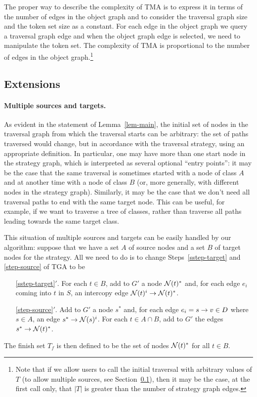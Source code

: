 The proper way to describe the complexity of TMA is to express it in
terms of the number of edges in the object graph and to consider the
traversal graph size and the token set size as a constant. For each
edge in the object graph we query a traversal graph edge and when the
object graph edge is selected, we need to manipulate the token
set. The complexity of TMA is proportional to the number of edges in
the object graph.\footnote{ Note that if we allow users to call the
initial traversal with arbitrary values of $T$ (to allow multiple
sources, see Section~\ref{ssec-rem}), then it may be the case, at the
first call only, that $|T|$ is greater than the number of strategy
graph edges.  }


\subsection{Extensions}
\label{ssec-rem}
\label{sec-ext}
\paragraph{Multiple sources and targets.}  As evident in the statement
of Lemma~\ref{lem-main}, the initial set of nodes in the traversal
graph from which the traversal starts can be arbitrary: the set of
paths traversed would change, but in accordance with the traversal
strategy, using an appropriate definition.  In particular, one may
have more than one start node in the strategy graph, which is
interpreted as several optional ``entry points'': it may be the case
that the same traversal is sometimes started with a node of class $A$
and at another time with a node of class $B$ (or, more generally, with
different nodes in the strategy graph).  Similarly, it may be the case
that we don't need all traversal paths to end with the same target
node.  This can be useful, for example, if we want to traverse a tree
of classes, rather than traverse all paths leading towards the same
target class.

This situation of multiple sources and targets can be easily handled
by our algorithm: suppose that we have a set $A$ of source nodes and a
set $B$ of target nodes for the strategy.  All we need to do is to
change Steps~\ref{sstep-target} and \ref{step-source} of TGA to be
\begin{enumerate}
\item[\ref{sstep-target}$'$.]
For each $t\in B$, add to $G'$ a node ${\cal N}(t)^*$ and, for each edge
$e_i$ coming into $t$ in $S$, an intercopy edge
${\cal N}(t)^i\stackrel{}{\rightarrow}{\cal N}(t)^*$.
\item[\ref{step-source}$'$.]
Add to $G'$ a node $s^*$ and, for each edge $e_i=s\stackrel{}{\rightarrow}v\in D$
where $s\in A$, an edge $s^*\stackrel{}{\rightarrow}{\cal N}(s)^i$.  For each
$t\in A\cap B$, add to $G'$ the edges $s^*\stackrel{}{\rightarrow}{\cal N}(t)^*$.
\end{enumerate}
The finish set $T_f$ is then defined to be the set of nodes ${\cal N}(t)^*$
for all $t\in B$.

